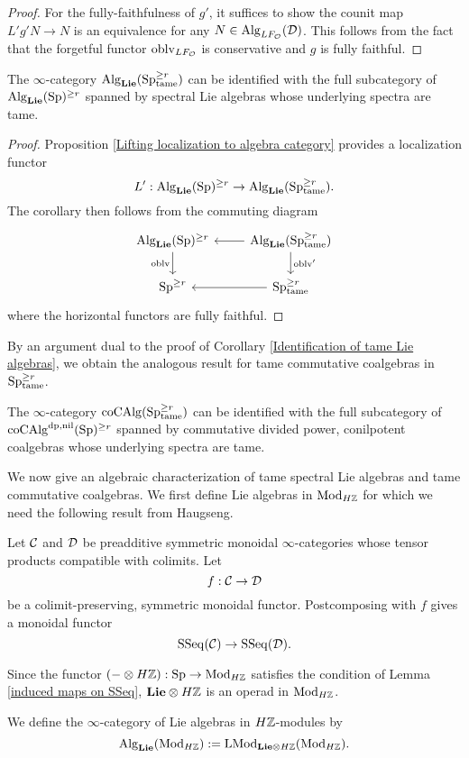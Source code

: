 \begin{proof}
    For the fully-faithfulness of $g'$, it suffices to show the counit map 
    $L'g'N \to N$ is an equivalence for any $N\in \operatorname{Alg}_{LF_{{\mathcal{O}}}}({\mathcal{D}})$. This follows from the fact that the forgetful functor $\operatorname{oblv}_{LF_{{\mathcal{O}}}}$ is conservative and $g$ is fully faithful.
\end{proof}

\begin{corollary}
\label{Identification of tame Lie algebras}
	The $\infty$-category $\operatorname{Alg}_{\mathbf{Lie}}(\operatorname{Sp}^{\geq r}_{\operatorname{\operatorname{tame}}})$ can be identified with the full subcategory of $\operatorname{Alg}_{\mathbf{Lie}}(\operatorname{Sp})^{\geq r}$ spanned by spectral Lie algebras whose underlying spectra are tame.
\end{corollary}
\begin{proof}
    Proposition \ref{Lifting localization to algebra category} provides a localization functor
	$$
	L': \operatorname{Alg}_{\mathbf{Lie}}(\operatorname{Sp})^{\geq r} \to \operatorname{Alg}_{\mathbf{Lie}}(\operatorname{Sp}^{\geq r}_{\operatorname{\operatorname{tame}}}).
	$$
	The corollary then follows from the commuting diagram
\[
\begin{tikzcd}
	\Alg_{\spLie}(\Sp)^{\geq r} & \Alg_{\spLie}(\Sp^{\geq r}_{\tame})\\
	\Sp^{\geq r}  & 
	\Sp^{\geq r}_{\tame}
	\arrow[from=1-2, to= 1-1]
	\arrow[from=1-1, to=2-1, "\oblv" left]
	\arrow[from=1-2, to=2-2, "\oblv'" ]
	\arrow[from=2-2, to= 2-1]
\end{tikzcd}
\]
where the horizontal functors are fully faithful. 

\end{proof}

By an argument dual to the proof of Corollary \ref{Identification of tame Lie algebras}, we obtain the analogous result for tame commutative coalgebras in $\operatorname{Sp}^{\geq r}_{\operatorname{\operatorname{tame}}}$. 
\begin{corollary}
\label{Identification of tame dp,nil coalgebras}
    The $\infty$-category $\operatorname{coCAlg}(\operatorname{Sp}^{\geq r}_{\operatorname{\operatorname{tame}}})$ can be identified with the full subcategory of $\operatorname{coCAlg}^{\operatorname{dp}, \operatorname{nil}}(\operatorname{Sp})^{\geq r}$ spanned by commutative divided power, conilpotent coalgebras whose underlying spectra are tame.
\end{corollary}

We now give an algebraic characterization of tame spectral Lie algebras and tame commutative coalgebras.
We first define Lie algebras in $\operatorname{Mod}_{H{\mathbb{Z}}}$ for which we need the following result from Haugseng.
\begin{lemma}
\label{induced maps on SSeq}
\cite[Corollary 4.2.9.]{Haugsengsymseq}
Let ${\mathcal{C}}$ and ${\mathcal{D}}$ be preadditive symmetric monoidal $\infty$-categories whose tensor products compatible with colimits. Let
$$
f: {\mathcal{C}} \to {\mathcal{D}}
$$
be a colimit-preserving, symmetric monoidal functor.
Postcomposing with $f$ gives a monoidal functor
$$
\operatorname{SSeq}({\mathcal{C}}) \to 
\operatorname{SSeq}({\mathcal{D}}).
$$
\end{lemma}	
Since the functor 
$(-\otimes H{\mathbb{Z}}):\operatorname{Sp} \to \operatorname{Mod}_{H{\mathbb{Z}}}$ satisfies the condition of Lemma \ref{induced maps on SSeq}, $\mathbf{Lie}\otimes H{\mathbb{Z}}$ is an operad in $\operatorname{Mod}_{H{\mathbb{Z}}}$.
\begin{definition}
We define the $\infty$-category of Lie algebras in $H{\mathbb{Z}}$-modules by 
$$
\operatorname{Alg}_{\mathbf{Lie}}(\operatorname{Mod}_{H{\mathbb{Z}}}): = \operatorname{LMod}_{\mathbf{Lie}\otimes H{\mathbb{Z}}}(\operatorname{Mod}_{H{\mathbb{Z}}}).
$$
\end{definition}

